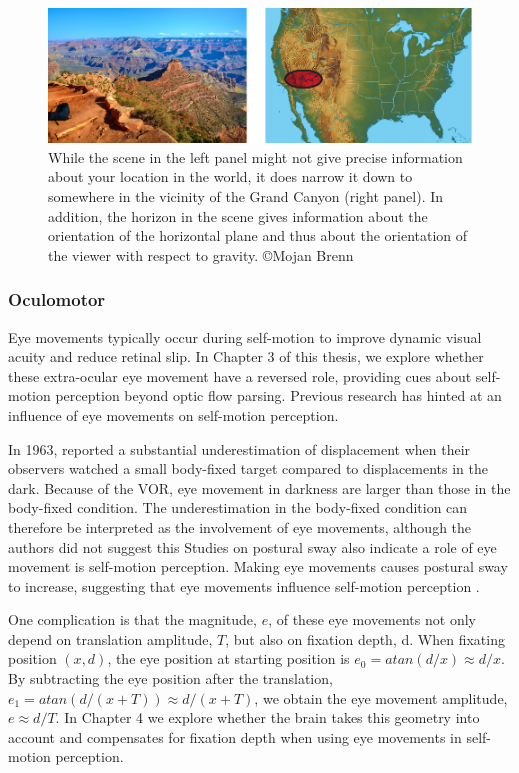 \begin{figure}
    \includegraphics[width=1.0\textwidth]{src/intro/figures/Canyon.pdf}

    \caption{While the scene in the left panel might not give precise information about your location in the world, it does narrow it down to somewhere in the vicinity of the Grand Canyon (right panel). In addition, the horizon in the scene gives information about the orientation of the horizontal plane and thus about the orientation of the viewer with respect to gravity. \copyright Mojan Brenn}
    \label{intro:fig1}
\end{figure}


\subsubsection{Oculomotor}
Eye movements typically occur during self-motion to improve dynamic visual acuity and reduce retinal slip. In Chapter 3 of this thesis, we explore whether these extra-ocular eye movement have a reversed role, providing cues about self-motion perception beyond optic flow parsing. Previous research has hinted at an influence of eye movements on self-motion perception.

In 1963, \citeauthor{guedry1963} reported a substantial underestimation of displacement when their observers watched a small body-fixed target compared to displacements in the dark. Because of the VOR, eye movement in darkness are larger than those in the body-fixed condition. The underestimation in the body-fixed condition can therefore be interpreted as the involvement of eye movements, although the authors did not suggest this 
Studies on postural sway also indicate a role of eye movement is self-motion perception. Making eye movements causes postural sway to increase, suggesting that eye movements influence self-motion perception \cite{glasauer2005,rogrigues2015}.

One complication is that the magnitude, $e$, of these eye movements not only depend on translation amplitude, $T$, but also on fixation depth, d. When fixating position $(x, d)$, the eye position at starting position is $e_0 = atan⁡(d/x) \approx d/x$. By subtracting the eye position after the translation, $e_1 = atan⁡(d/(x+T)) \approx d/(x+T)$, we obtain the eye movement amplitude, $e \approx d/T$. In Chapter 4 we explore whether the brain takes this geometry into account and compensates for fixation depth when using eye movements in self-motion perception.


